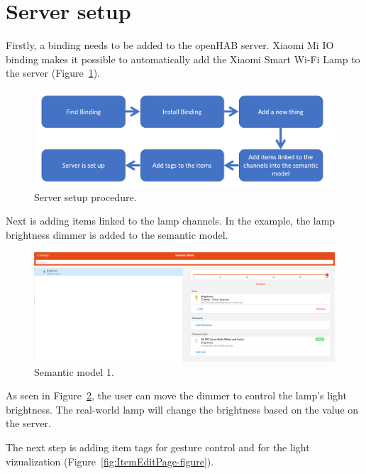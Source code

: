 \section{Server setup}
Firstly, a binding needs to be added to the openHAB server. Xiaomi Mi IO binding makes it possible to automatically add the Xiaomi Smart Wi-Fi Lamp to the server (Figure~\ref{fig:ServerSetupProcedure-figure}).

\begin{figure}
  \centering
  \includegraphics[width = 0.9 \linewidth]{figures/ServerSetupProcedure.png}
  \caption{Server setup procedure.}
  \label{fig:ServerSetupProcedure-figure}
\end{figure}

Next is adding items linked to the lamp channels. In the example, the lamp brightness dimmer is added to the semantic model.

\begin{figure}
  \centering
  \includegraphics[width = 0.9 \linewidth]{figures/SemanticModelOne.png}
  \caption{Semantic model 1.}
  \label{fig:SemanticModelOne-figure}
\end{figure}

As seen in Figure~\ref{fig:SemanticModelOne-figure}, the user can move the dimmer to control the lamp's light brightness. The real-world lamp will change the brightness based on the value on the server.

The next step is adding item tags for gesture control and for the light vizualization (Figure~\ref{fig:ItemEditPage-figure}).


